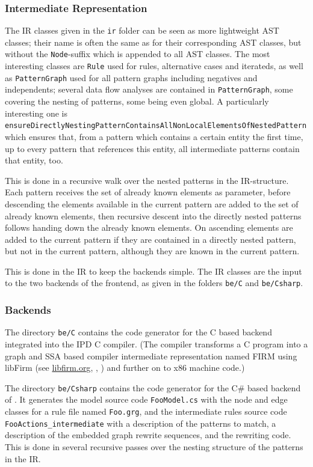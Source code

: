 \subsubsection*{Intermediate Representation}
The IR classes given in the \texttt{ir} folder can be seen as more lightweight AST classes; their name is often the same as for their corresponding AST classes, but without the \texttt{Node}-suffix which is appended to all AST classes.
The most interesting classes are \texttt{Rule} used for rules, alternative cases and iterateds, as well as \texttt{PatternGraph} used for all pattern graphs including negatives and independents;
several data flow analyses are contained in \texttt{PatternGraph}, some covering the nesting of patterns, some being even global.
A particularly interesting one is \texttt{ensure\-Directly\-Nesting\-Pattern\-Contains\-All\-Non\-Local\-Elements\-Of\-Nested\-Pattern} which ensures that, from a pattern which contains a certain entity the first time, up to every pattern that references this entity, all intermediate patterns contain that entity, too.

This is done in a recursive walk over the nested patterns in the IR-structure. 
Each pattern receives the set of already known elements as parameter,
before descending the elements available in the current pattern are added to the set of already known elements,
then recursive descent into the directly nested patterns follows handing down the already known elements.
On ascending elements are added to the current pattern if they are contained in a directly nested pattern, but not in the current pattern, although they are known in the current pattern.

This is done in the IR to keep the backends simple.
The IR classes are the input to the two backends of the frontend, as given in the folders \texttt{be/C} and \texttt{be/Csharp}.


\subsubsection*{Backends}

The directory \texttt{be/C} contains the code generator for the C based backend integrated into the IPD C compiler.
(The compiler transforms a C program into a graph and SSA based compiler intermediate representation named FIRM using libFirm (see \url{libfirm.org}, \cite{TBL:99}, \cite{Lin:02}) and further on to x86 machine code.)

The directory \texttt{be/Csharp} contains the code generator for the C\# based backend of \GrG. 
It generates the model source code \texttt{FooModel.cs} with the node and edge classes for a rule file named \texttt{Foo.grg}, 
and the intermediate rules source code \texttt{FooActions\_intermediate} with a description of the patterns to match, a description of the embedded graph rewrite sequences, and the rewriting code.
This is done in several recursive passes over the nesting structure of the patterns in the IR. 

